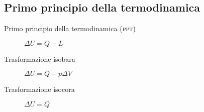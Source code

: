 \documentclass[a4paper,11pt,italian]{article}
\begin{document}
\subsection{Primo principio della termodinamica}

\begin{description}
  
  \item[Primo principio della termodinamica (\textsc{ppt})] 
  $ \Delta U = Q - L $
%   
  
%   
%   
%   
  
  \item[Trasformazione isobara] $ \Delta U = Q - p \Delta V $
  
% 
  
  \item[Trasformazione isocora] $ \Delta U = Q $%
%
% 


\end{description}
\end{document}
